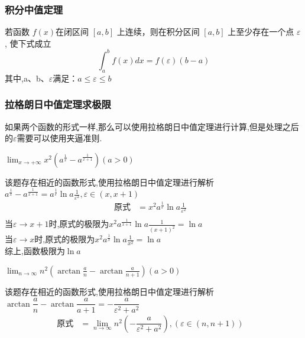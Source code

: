 \documentclass[8pt a4paper, oneside, UTF8]{ctexbook}
\begin{document}
\begin{sloppypar}
    \subsubsection{积分中值定理}\label{jfzz1}
    \begin{defn}{}{}
        若函数 $f\left(x\right)$在闭区间 $[a,b]$ 上连续，则在积分区间 $[a,b]$ 上至少存在一个点 $\varepsilon$ , 使下式成立
            $$
                \int_a^bf\left(x\right)dx=f\left(\varepsilon\right)\left(b-a\right)
            $$
        其中,a、b、$\varepsilon$满足：$a\leq\varepsilon\leq b$
    \end{defn}
    \subsubsection{拉格朗日中值定理求极限}
    如果两个函数的形式一样,那么可以使用拉格朗日中值定理进行计算,但是处理之后的$\varepsilon$需要可以使用夹逼准则.
    \begin{problem}
    $\lim_{x\to+\infty}x^{2}\left(a^{\frac{1}{x}}-a^{\frac{1}{x+1}}\right)\left(a>0\right)$        
    \end{problem}
    \begin{solution}
        该题存在相近的函数形式,使用拉格朗日中值定理进行解析$a^{\frac{1}{x}}-a^{\frac{1}{x+1}}=a^{\frac{1}{\varepsilon}}\ln a\frac{1}{\varepsilon ^2},\varepsilon \in (x,x+1)$
        \begin{align*}
            \text{原式} & = x^2 a^{\frac{1}{\varepsilon}}\ln a\frac{1}{\varepsilon ^2} &\\
        \end{align*}
        当$\varepsilon \to x+1$时,原式的极限为$x^2 a^{\frac{1}{x+1}}\ln a \frac{1}{(x+1)^2}=\ln a$\\
        当$\varepsilon \to x$时,原式的极限为$x^2 a^{\frac{1}{x}}\ln a \frac{1}{x^2}=\ln a$\\
        综上,函数极限为$\ln a$
    \end{solution}
    \begin{problem}
        $\lim_{n\to\infty}n^{2}\left(\arctan\frac{a}{n}-\arctan\frac{a}{n+1}\right)\left(a>0\right)$
    \end{problem}
    \begin{solution}
        该题存在相近的函数形式,使用拉格朗日中值定理进行解析$\arctan \dfrac{a}{n}-\arctan \dfrac{a}{a+1}=-\dfrac{a}{ \varepsilon^2 +a^2}$
        \begin{align*}
            \text{原式} & =\lim_{n\to \infty} n^2(-\dfrac{a}{\varepsilon^2+a^2}),(\varepsilon \in (n,n+1) ) &\\

\end{align*}
\end{solution}
\end{sloppypar}
\end{document}
